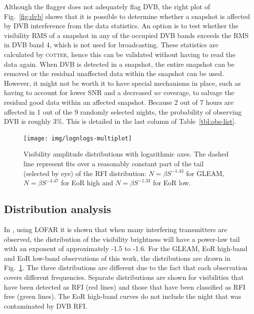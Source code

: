 \documentclass{pasa}
\begin{document}
Although the flagger does not adequately flag DVB, the right plot of Fig.~\ref{fig:dvb} shows that it is possible to determine whether a snapshot is affected by DVB interference from the data statistics. An option is to test whether the visibility RMS of a snapshot in any of the occupied DVB bands exceeds the RMS in DVB band 4, which is not used for broadcasting. These statistics are calculated by \textsc{cotter}, hence this can be validated without having to read the data again. When DVB is detected in a snapshot, the entire snapshot can be removed or the residual unaffected data within the snapshot can be used. However, it might not be worth it to have special mechanisms in place, such as having to account for lower SNR and a decreased $uv$ coverage, to salvage the residual good data within an affected snapshot. Because 2 out of 7 hours are affected in 1 out of the 9 randomly selected nights, the probability of observing DVB is roughly 3\%. This is detailed in the last column of Table~\ref{tbl:obs-list}. 

\noindent\begin{figure}
\begin{center}\hspace*{-0.2cm}\texttt{[image: img/lognlogs-multiplot]}
\caption{Visibility amplitude distributions with logarithmic axes. The dashed line represent fits over a reasonably constant part of the tail (selected by eye) of the RFI distribution: $N=\beta S^{-1.43}$ for GLEAM, $N=\beta S^{-4.47}$ for EoR high and $N=\beta S^{-1.33}$ for EoR low.}
\label{fig:lognlogs}
\end{center}
\end{figure}

\subsection{Distribution analysis}
In \citet{offringa-rfi-distributions}, using LOFAR it is shown that when many interfering transmitters are observed, the distribution of the visibility brightness will have a power-law tail with an exponent of approximately -1.5 to -1.6. For the GLEAM, EoR high-band and EoR low-band observations of this work, the distributions are drawn in Fig.~\ref{fig:lognlogs}. The three distributions are different due to the fact that each observation covers different frequencies.  Separate distributions are shown for visibilities that have been detected as RFI (red lines) and those that have been classified as RFI free (green lines). The EoR high-band curves do not include the night that was contaminated by DVB RFI.
\end{document}
